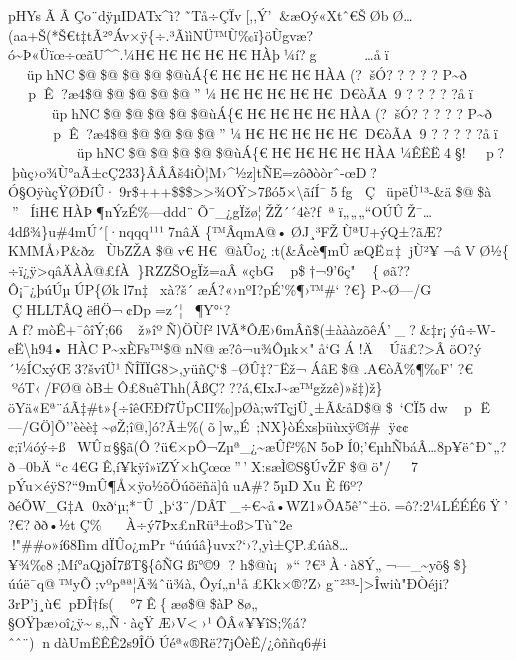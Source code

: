 pHYs  Ã  ÃÇo¨d  ÿµIDATx\^{}ì?˜Tå÷ÇÏv{[},,Ý'\&æOý«Xtˆ€ŠØbØ\ldots(aa+Š(*Š€t‡tÃ²°Áv×ÿ\{÷.³ÃììNÜ™Ù‰ï\}öÙgvæ?ó\textasciitilde Þ«Üïœ÷œãU\^{}\^{}.¼H€H€H€H€H€HÀþ¼í?g
\ldots åï     ~üphNC\$@\$@\$@\$@\$@ùÁ\{€H€H€H€H€HÀA(?šÓ?  ?  ?  ?  ? 
P\textasciitilde ð     pÊ?æ4\$@\$@\$@\$@\$@''¼H€H€H€H€H€D€òÃA~9 ?  ?  ?  ? 
? åï     ~üphNC\$@\$@\$@\$@\$@ùÁ\{€H€H€H€H€HÀA(?šÓ?  ?  ?  ?  ? 
P\textasciitilde ð     pÊ?æ4\$@\$@\$@\$@\$@''¼H€H€H€H€H€D€òÃA~9 ?  ?  ?  ? 
? åï     ~üphNC\$@\$@\$@\$@\$@ùÁ\{€H€H€H€H€HÀA¼ÊËË4§!
p?þùç›o¾Ù°aÃ±cÇ233\}\textbar\textbar ÂÂÂš4iÒ¦M›\^{}½z{]}tÑE=zôðòòrˆ-œD?Ó§OÿùçŸØÐíÛ·9r\$+++\$\$\$\textgreater\textgreater¾OŸ\textgreater7ß\textbar ó5×\textbackslash ãíÍ¯5fg
Ç~üpëÜ¹³-\&ä\$@\$à
''ÍiH€HÀÞ¶nÝzÉ\%---ddd¨Õ¯\_¿gÏžø¦ŽŽ´´4è?ƒªï„„„``\textquotesingle OÚÛŽ¯\ldots 4dß¾\}u\#4mÚ´{[}·nqqq¹¹¹7n\textbar âÄ
\{™ÂqmA@•ØJ¸³FŽÙªU+ýQ±?ãÆ?KMMÅ›P\&ðzÙbZŽA\$@v€H€@àÛo¿:t(\&Âcè¶mÛæQË¤‡jÙ²¥¬âVØ½\{÷ï¿ÿ\textgreater qâÄÀÀ@£ƒÀ\}RZZŠOgÏž=aÂ«çbG
p\$†¬9'6ç" \{øã??Ô¡¯¿þúÚµÚP\{Økl7n‡xà?š´æÁ?«›nºI?pÉ'\%¶›™\#`  ?€\}
P\textasciitilde Ø---/G\textquotesingle
ÇHLLT\textquotesingle ÂQëflÖ¬¢Dp=z´¦­¶Y°`?Aƒ?mòÊ+¯ôîÝ;66ž»îºÑ)ÖÙf²lVÃ*ÔÆ›6mÂñ\$(±àààzõêÁ'\_\textbar?\&‡r¡ýû÷W­­eË\textbackslash h94•HÀCP\textasciitilde xÈFs™\$@nN@æ?ô¬u¾Ôµk×"å`GÁ!Ä\textquotesingle
Úä£?\textgreater ÂöO?ý´½ÍCxýŒ3?švîÜ¹ÑÎÏÏG8\textgreater,yüñÇ`\$
--ØÛ ‡?¯Ëž¬ÁâE\$@.A€òÃ\%¶‰F'  ?€
ºóT‹/FØ@òB±Ô£8uêThh(ÂßÇ???á‚€IxJ\textasciitilde æ™gžzê)»š‡)ž\}öYä«Eª¨áÃ‡\#t»\{÷îêŒÐf7ÜpCII‰{]}pØà;wîTçjÜ¸±Ã\&åD\$@\$~` CÏ5dw
p
Ë---/GÖ{]}Õ''èèè‡\textasciitilde øŽ;î@‚{]}ó?Ã±\%(õ{]}w„É~;NX\}òÉ\textquotesingle xsþüùx­ÿ©î\#ÿ¢¢¢;ï¼óý÷ßWÛ¤§§ã(Ô?ü€×pÔ¬Zµª\_¿\textasciitilde æÛf²\%N5oÞÍ0;'€µhÑbáÂ\ldots8p¥ëˆÐ\textbar˜„?ð--0bÄ``c4€G\textquotesingle Ê,í¥kÿî»ïZÝ×hÇœœ''\,'X\textbar:sæÌ©S§Úv\textbar ŽF\$@ö" /
7 pÝu×éÿS?{}``9mÛ¶Å×ÿo½õÖúõëñä{]}ûuA\#?5µDXu
Èƒ6º?ðéÕW\_G‡A0xð`µ;*¯Û¸þ`3¨/DÂT\_÷€\textasciitilde å•WZ1»ÕA5ê'­˜±ö.=ô?:2¼LÉÉÉ6Ÿ' 
?€?ðð•½tÇ\% À÷ý7Þx£nRü³±oß\textgreater Tù˜2e
!"\#\#o»í68IìmdÏÛo¿mPr``úúúâ\}uvx?{}`›?,yì±ÇP.£úà8\ldots¥¾‰8;Mí°aQjðÍ7ßT§\{ôÑGßï°©9
?  h\$@ù¡ »`` 
?€³À·à8Ý„¬---\_\textasciitilde yõ§\$\}úúë¯q@™yÕ;vºpªª¦Ä¾ˆü¾à‚Ôyí\textquotesingle„n¹å£Kk×®?Z›g¨²³³-{]}\textgreater Îwiù"ÐÒéji?3rP'j¸ù€pÐÎ†ƒs(
°7Ê\{æø\$@\$àP8ø„
§OŸþæ›oî¿ÿ\textasciitildes‚,Ñ·àçŸÆ›V\textless›¹ÔÂ«¥¥îS;\%á?ˆˆ¨)ndàUmËÊÊ2s9ÎÖÚéª«®Rë?7jÔèË/¿ôññq6\#i
